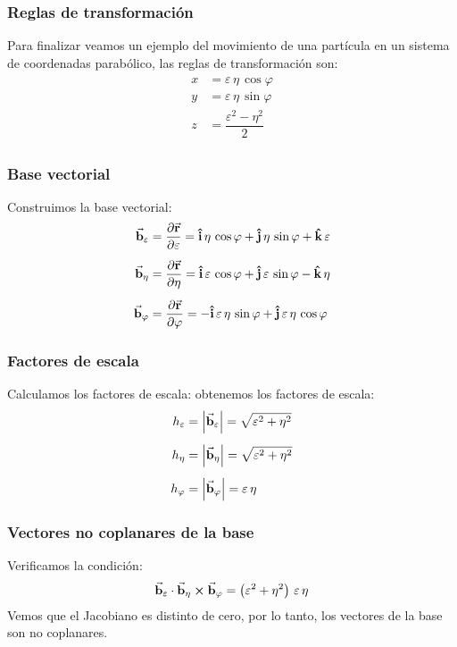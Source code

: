 \documentclass[12pt]{beamer}
\begin{document}
\begin{frame}
\frametitle{Reglas de transformación}
Para finalizar veamos un ejemplo del movimiento de una partícula en un sistema de coordenadas parabólico, las reglas de transformación son:
\pause
\begin{align}
\begin{aligned}
x &= \varepsilon \, \eta \, \cos \varphi \\[0.3em]
y &= \varepsilon \, \eta \, \sin \varphi \\[0.3em]
z &= \dfrac{\varepsilon^{2} - \eta^{2}}{2}
\end{aligned}
\label{eq:ecuacion_01_16}
\end{align}
\end{frame}
\begin{frame}
\frametitle{Base vectorial}
Construimos la base vectorial:
\pause
\begin{align}
\begin{aligned}
\va{b}_{\varepsilon} &= \pdv{\va{r}}{\varepsilon} = \vu{i} \, \eta \, \cos \varphi + \vu{j} \, \eta \, \sin \varphi + \vu{k} \, \varepsilon \\[0.5em]
\va{b}_{\eta} &= \pdv{\va{r}}{\eta} = \vu{i} \, \varepsilon \, \cos \varphi + \vu{j} \, \varepsilon \, \sin \varphi - \vu{k} \, \eta \\[0.5em]
\va{b}_{\varphi} &= \pdv{\va{r}}{\varphi} = - \vu{i} \, \varepsilon \, \eta \, \sin \varphi + \vu{j} \, \varepsilon \, \eta \, \cos \varphi
\end{aligned}
\label{eq:ecuacion_01_17}
\end{align}
\end{frame}
\begin{frame}
\frametitle{Factores de escala}
Calculamos los factores de escala:
\pause
obtenemos los factores de escala:
\begin{align}
\begin{aligned}
h_{\varepsilon} &= \abs{\va{b}_{\varepsilon}} = \sqrt{\varepsilon^{2} + \eta^{2}} \\[0.5em]
h_{\eta} &= \abs{\va{b}_{\eta}} = \sqrt{\varepsilon^{2} + \eta^{2}} \\[0.5em]
h_{\varphi} &= \abs{\va{b}_{\varphi}} = \varepsilon \, \eta
\end{aligned}
\label{eq:ecuacion_01_18}
\end{align}
\end{frame}
\begin{frame}
\frametitle{Vectores no coplanares de la base}
Verificamos la condición:
\pause
\begin{align}
\va{b}_{\varepsilon} \cdot \va{b}_{\eta} \cp \va{b}_{\varphi} = \left( \varepsilon^{2} + \eta^{2} \right) \, \varepsilon \, \eta
\label{eq:ecuacion_01_19}
\end{align}
Vemos que el Jacobiano es distinto de cero, por lo tanto, los vectores de la base son no coplanares.
\end{frame}
\end{document}
